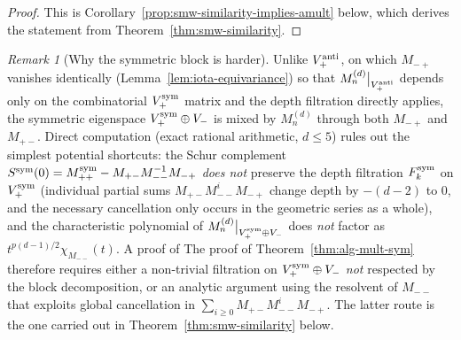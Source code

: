 \documentclass{amsart}
\theoremstyle{definition}
\theoremstyle{remark}
\newtheorem{remark}[theorem]{Remark}
\begin{document}
\begin{proof}
This is Corollary~\ref{prop:smw-similarity-implies-amult}
below, which derives the statement from
Theorem~\ref{thm:smw-similarity}.
\end{proof}

\begin{remark}[Why the symmetric block is harder]
\label{rem:why-sym-harder}
Unlike $V_+^{\rm anti}$, on which $M_{-+}$ vanishes
identically (Lemma~\ref{lem:iota-equivariance}) so that
$M_n^{(d)}\big|_{V_+^{\rm anti}}$ depends only on the
combinatorial $V_+^{\rm sym}$ matrix and the depth filtration
directly applies, the symmetric eigenspace $V_+^{\rm sym}
\oplus V_-$ is mixed by $M_n^{(d)}$ through both $M_{-+}$ and
$M_{+-}$.  Direct computation \textup{(}exact rational
arithmetic, $d \le 5$\textup{)} rules out the simplest
potential shortcuts: the Schur complement
$S^{\rm sym}(0) = M_{++}^{\rm sym} - M_{+-} M_{--}^{-1} M_{-+}$
\emph{does not} preserve the depth filtration
$F_k^{\rm sym}$ on $V_+^{\rm sym}$
(individual partial sums $M_{+-} M_{--}^{i} M_{-+}$ change
depth by $-(d-2)$ to $0$, and the necessary cancellation only
occurs in the geometric series as a whole), and the
characteristic polynomial of
$M_n^{(d)}\big|_{V_+^{\rm sym} \oplus V_-}$ does \emph{not}
factor as $t^{p(d-1)/2} \chi_{M_{--}}(t)$.  A proof of
The proof of Theorem~\ref{thm:alg-mult-sym} therefore requires either
a non-trivial filtration on $V_+^{\rm sym} \oplus V_-$
\emph{not} respected by the block decomposition, or an
analytic argument using the resolvent of $M_{--}$ that exploits
global cancellation in $\sum_{i \ge 0} M_{+-} M_{--}^{i}
M_{-+}$.  The latter route is the one carried out in
Theorem~\ref{thm:smw-similarity} below.
\end{remark}
\end{document}
